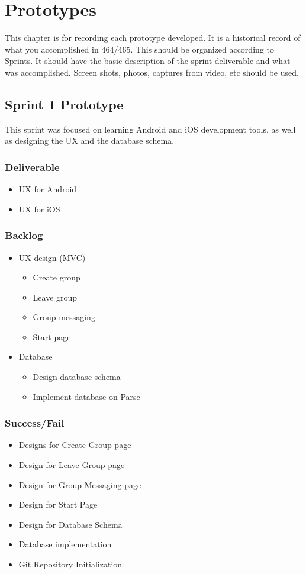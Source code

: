 

\chapter{Prototypes}

This chapter is for recording each prototype developed.  It is a historical record of what you accomplished in 464/465.   This should be organized according to Sprints.  It should have the basic description of the sprint deliverable and what was accomplished.  Screen shots, photos, captures from video, etc should be used.  

\section{Sprint 1 Prototype}
This sprint was focused on learning Android and iOS development tools, as well as designing the UX and the database schema.
\subsection{Deliverable}
	\begin{itemize}
		\item UX for Android
		\item UX for iOS
	\end{itemize}
\subsection{Backlog}
	\begin{itemize}
		\item UX design (MVC)
		\begin{itemize}
			\item Create group
			\item Leave group
			\item Group messaging
			\item Start page
		\end{itemize}
		\item Database
		\begin{itemize}
			\item Design database schema
			\item Implement database on Parse
		\end{itemize}
	\end{itemize}
\subsection{Success/Fail}
\begin{itemize}
	\item Designs for Create Group page
	\item Design for Leave Group page
	\item Design for Group Messaging page
	\item Design for Start Page
	\item Design for Database Schema
	\item Database implementation
	\item Git Repository Initialization
\end{itemize}

